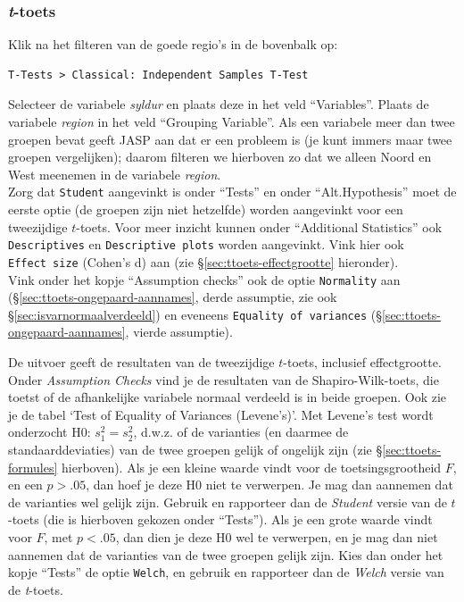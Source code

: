 \documentclass[
]{book}
\begin{document}
\subsubsection{\texorpdfstring{\emph{t}-toets}{t-toets}}\label{t-toets}

Klik na het filteren van de goede regio's in de bovenbalk op:

\begin{verbatim}
T-Tests > Classical: Independent Samples T-Test
\end{verbatim}

Selecteer de variabele \emph{syldur} en plaats deze in het veld ``Variables''.
Plaats de variabele \emph{region} in het veld ``Grouping Variable''. Als een
variabele meer dan twee groepen bevat geeft JASP aan dat er een probleem
is (je kunt immers maar twee groepen vergelijken); daarom filteren we
hierboven zo dat we alleen Noord en West meenemen in de variabele
\emph{region}.\\
Zorg dat \texttt{Student} aangevinkt is onder ``Tests'' en onder ``Alt.Hypothesis''
moet de eerste optie (de groepen zijn niet hetzelfde) worden aangevinkt
voor een tweezijdige \(t\)-toets. Voor meer inzicht kunnen onder
``Additional Statistics'' ook \texttt{Descriptives} en \texttt{Descriptive\ plots} worden
aangevinkt. Vink hier ook \texttt{Effect\ size} (Cohen's d) aan (zie
§\ref{sec:ttoets-effectgrootte} hieronder).\\
Vink onder het kopje ``Assumption checks'' ook de optie \texttt{Normality} aan
(§\ref{sec:ttoets-ongepaard-aannames}, derde assumptie, zie ook
§\ref{sec:isvarnormaalverdeeld}) en eveneens \texttt{Equality\ of\ variances}
(§\ref{sec:ttoets-ongepaard-aannames}, vierde assumptie).

De uitvoer geeft de resultaten van de tweezijdige \(t\)-toets, inclusief
effectgrootte.\\

Onder \emph{Assumption Checks} vind je de resultaten van de
Shapiro-Wilk-toets, die toetst of de afhankelijke variabele normaal
verdeeld is in beide groepen. Ook zie je de tabel `Test of Equality of
Variances (Levene's)'. Met Levene's test wordt onderzocht H0:
\(s^2_1 = s^2_2\), d.w.z. of de varianties (en daarmee de
standaarddeviaties) van de twee groepen gelijk of ongelijk zijn (zie
§\ref{sec:ttoets-formules} hierboven). Als je een kleine waarde vindt
voor de toetsingsgrootheid \(F\), en een \(p>.05\), dan hoef je deze H0 niet
te verwerpen. Je mag dan aannemen dat de varianties wel gelijk zijn.
Gebruik en rapporteer dan de \emph{Student} versie van de \(t\)-toets (die is
hierboven gekozen onder ``Tests''). Als je een grote waarde vindt voor
\(F\), met \(p<.05\), dan dien je deze H0 wel te verwerpen, en je mag dan
niet aannemen dat de varianties van de twee groepen gelijk zijn. Kies
dan onder het kopje ``Tests'' de optie \texttt{Welch}, en gebruik en rapporteer
dan de \emph{Welch} versie van de \emph{t}-toets.\\
\end{document}
